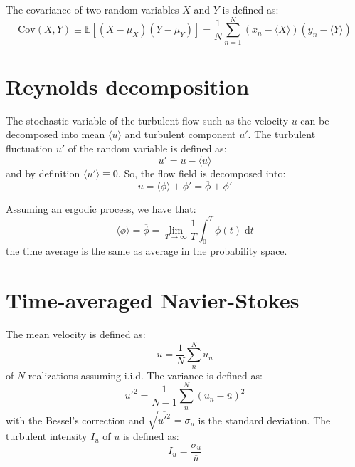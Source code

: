 The covariance of two random variables $X$ and $Y$ is defined as:
\begin{equation}
\mathrm{Cov}\left(X, Y \right) \equiv \mathbb{E} \left[ \left(X - \mu_{X}\right) \left(Y - \mu_{Y}\right) \right] = \frac{1}{N} \sum_{n=1}^{N} \left( x_n - \langle X \rangle\right)  \left( y_n - \langle Y \rangle\right)
\end{equation}


\section*{Reynolds decomposition}

The stochastic variable of the turbulent flow such as the velocity $u$ can be decomposed into mean $\langle u \rangle$ and turbulent component $u'$. The turbulent fluctuation $u'$ of the random variable is defined as:
\begin{equation}
u' = u - \langle u \rangle
\end{equation}
and by definition $\langle u' \rangle \equiv 0$. So, the flow field is decomposed into:
\begin{equation}
u = \langle \phi \rangle + \phi' = \overline{\phi} + \phi'
\end{equation}

Assuming an ergodic process, we have that:
\begin{equation}
\langle \phi \rangle = \overline{\phi} = \lim\limits_{T\rightarrow\infty}\frac{1}{T} \int_{0}^{T} \phi(t)\;\mathrm{d}t
\end{equation}
the time average is the same as average in the probability space.

\section*{Time-averaged Navier-Stokes}

The mean velocity is defined as:
\begin{equation}
\overline{u} = \frac{1}{N} \sum_n^N u_n
\end{equation}
of $N$ realizations assuming i.i.d. The variance is defined as:
\begin{equation}
\overline{u'^2} = \frac{1}{N-1} \sum_n^N \left(u_n - \overline{u} \right)^2
\end{equation}
with the Bessel's correction and $\sqrt{\overline{u'^2}} = \sigma_u$ is the standard deviation. The turbulent intensity $I_u$ of $u$ is defined as:
\begin{equation}
I_u = \frac{\sigma_u}{\overline{u}}
\end{equation}

